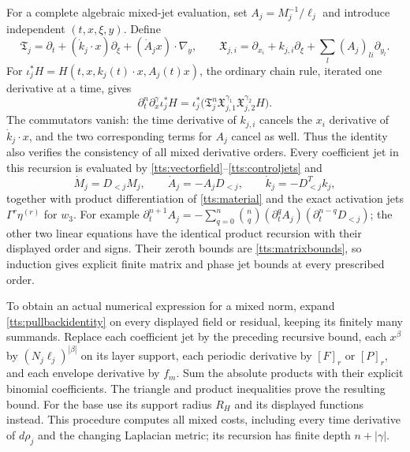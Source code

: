 For a complete algebraic mixed-jet evaluation, set
$A_j=M_j^{-1}/\ell_j$ and introduce independent
$(t,x,\xi,y)$. Define
\begin{equation}\label{tts:pullbackops}
 \mathfrak T_j=\partial_t+(\dot k_j\cdot x)\partial_\xi
                                  +(\dot A_jx)\cdot\nabla_y,
 \qquad
 \mathfrak X_{j,i}=\partial_{x_i}+k_{j,i}\partial_\xi
                                +\sum_l(A_j)_{li}\partial_{y_l}.
\end{equation}
For $\iota_j^*H=H(t,x,k_j(t)\cdot x,A_j(t)x)$, the ordinary
chain rule, iterated one derivative at a time, gives
\begin{equation}\label{tts:pullbackidentity}
 \partial_t^n\partial_x^\gamma\iota_j^*H
 =\iota_j^*\bigl(\mathfrak T_j^n
        \mathfrak X_{j,1}^{\gamma_1}\mathfrak X_{j,2}^{\gamma_2}H\bigr).
\end{equation}
The commutators vanish: the time derivative of $k_{j,i}$
cancels the $x_i$ derivative of $\dot k_j\cdot x$, and
the two corresponding terms for $A_j$ cancel as well. Thus the
identity also verifies the consistency of all mixed derivative orders.
Every coefficient jet in this recursion is evaluated by
\eqref{tts:vectorfield}--\eqref{tts:controljets} and
\[
 \dot M_j=D_{<j}M_j,\qquad
 \dot A_j=-A_jD_{<j},\qquad
 \dot k_j=-D_{<j}^Tk_j,
\]
together with product differentiation of \eqref{tts:material}
and the exact activation jets $\Gamma^r\eta^{(r)}$ for $w_3$.
For example
$\partial_t^{n+1}A_j=-\sum_{q=0}^n\binom nq
(\partial_t^qA_j)(\partial_t^{n-q}D_{<j})$;
the other two linear equations have the identical product recursion
with their displayed order and signs. Their zeroth bounds are
\eqref{tts:matrixbounds}, so induction gives explicit finite
matrix and phase jet bounds at every prescribed order.

To obtain an actual numerical expression for a mixed norm, expand
\eqref{tts:pullbackidentity} on every displayed field or residual,
keeping its finitely many summands. Replace each coefficient jet by
the preceding recursive bound, each $x^\beta$ by
$(N_j\ell_j)^{|\beta|}$ on its layer support, each periodic
derivative by $[F]_r$ or $[P]_r$, and each envelope derivative by
$f_m$. Sum the absolute products with their explicit binomial
coefficients. The triangle and product inequalities prove the
resulting bound. For the base use its support radius $R_H$ and
its displayed functions instead. This procedure computes all mixed
costs, including every time derivative of $d\rho_j$ and the changing
Laplacian metric; its recursion has finite depth $n+|\gamma|$.


